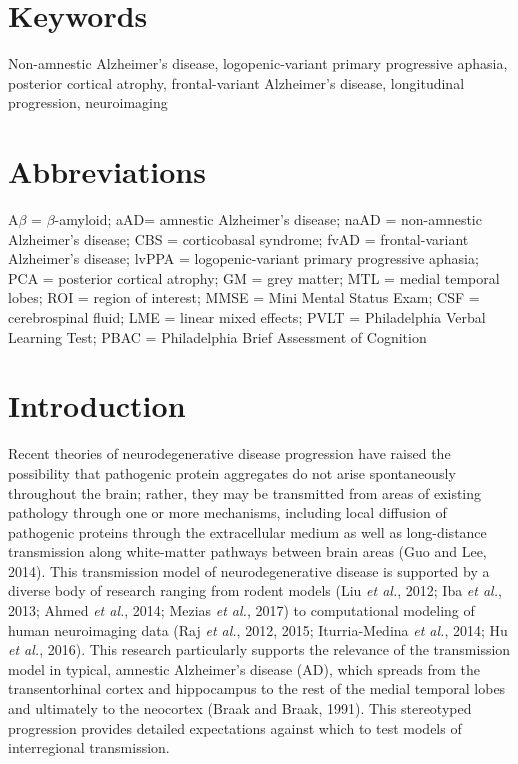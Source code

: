\documentclass[]{article}
\begin{document}
\section*{Keywords}\label{keywords}

Non-amnestic Alzheimer's disease, logopenic-variant primary progressive
aphasia, posterior cortical atrophy, frontal-variant Alzheimer's
disease, longitudinal progression, neuroimaging

\section*{Abbreviations}\label{abbreviations}

A\(\beta\) = \(\beta\)-amyloid; aAD= amnestic Alzheimer's disease; naAD
= non-amnestic Alzheimer's disease; CBS = corticobasal syndrome; fvAD =
frontal-variant Alzheimer's disease; lvPPA = logopenic-variant primary
progressive aphasia; PCA = posterior cortical atrophy; GM = grey matter;
MTL = medial temporal lobes; ROI = region of interest; MMSE = Mini
Mental Status Exam; CSF = cerebrospinal fluid; LME = linear mixed
effects; PVLT = Philadelphia Verbal Learning Test; PBAC = Philadelphia
Brief Assessment of Cognition

\newpage

\section*{Introduction}\label{introduction}

Recent theories of neurodegenerative disease progression have raised the
possibility that pathogenic protein aggregates do not arise
spontaneously throughout the brain; rather, they may be transmitted from
areas of existing pathology through one or more mechanisms, including
local diffusion of pathogenic proteins through the extracellular medium
as well as long-distance transmission along white-matter pathways
between brain areas (Guo and Lee, 2014). This transmission model of
neurodegenerative disease is supported by a diverse body of research
ranging from rodent models (Liu \emph{et al.}, 2012; Iba \emph{et al.},
2013; Ahmed \emph{et al.}, 2014; Mezias \emph{et al.}, 2017) to
computational modeling of human neuroimaging data (Raj \emph{et al.},
2012, 2015; Iturria-Medina \emph{et al.}, 2014; Hu \emph{et al.}, 2016).
This research particularly supports the relevance of the transmission
model in typical, amnestic Alzheimer's disease (AD), which spreads from
the transentorhinal cortex and hippocampus to the rest of the medial
temporal lobes and ultimately to the neocortex (Braak and Braak, 1991).
This stereotyped progression provides detailed expectations against
which to test models of interregional transmission.
\end{document}
